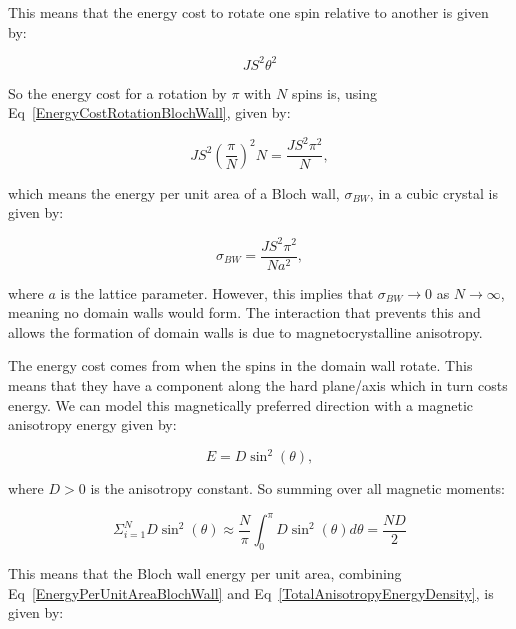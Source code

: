 \noindent This means that the energy cost to rotate one spin relative to another is given by:

\begin{equation}
    JS^2\theta^2
    \label{EnergyCostRotationBlochWall}
\end{equation}

\noindent So the energy cost for a rotation by $\pi$ with $N$ spins is, using Eq~\ref{EnergyCostRotationBlochWall}, given by:

\begin{equation}
    JS^2(\frac{\pi}{N})^2 N = \frac{JS^2\pi^2}{N},
    \label{FullEnergyCostBlochWall}
\end{equation}

\noindent which means the energy per unit area of a Bloch wall, $\sigma_{BW}$, in a cubic crystal is given by:

\begin{equation}
    \sigma_{BW} =  \frac{JS^2\pi^2}{Na^2},
    \label{EnergyPerUnitAreaBlochWall}
\end{equation}

\noindent where $a$ is the lattice parameter. However, this implies that $\sigma_{BW} \rightarrow 0$ as $N \rightarrow \infty$, meaning no domain walls would form. The interaction that prevents this and allows the formation of domain walls is due to magnetocrystalline anisotropy.

\noindent The energy cost comes from when the spins in the domain wall rotate. This means that they have a component along the hard plane/axis which in turn costs energy. We can model this magnetically preferred direction with a magnetic anisotropy energy given by:

\begin{equation}
    E = D\sin^2(\theta),
    \label{AnisotropyEnergy}
\end{equation}

\noindent where $D > 0$ is the anisotropy constant. So summing over all magnetic moments:

\begin{equation}
    \Sigma_{i = 1}^N D\sin^2(\theta) \approx \frac{N}{\pi} \int_0^\pi D\sin^2(\theta) d\theta = \frac{ND}{2}
    \label{TotalAnisotropyEnergyDensity}
\end{equation}

\noindent This means that the Bloch wall energy per unit area, combining Eq~\ref{EnergyPerUnitAreaBlochWall} and Eq~\ref{TotalAnisotropyEnergyDensity}, is given by:

